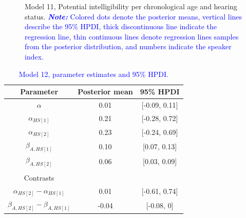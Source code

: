 \documentclass[
  authoryear,
  preprint,
  1p]{elsarticle}
\begin{document}
\label{cell-fig-rq3-intelligibility-model11}
\begin{figure}[H]


\caption{\label{fig-rq3-intelligibility-model11}Model 11, Potential
intelligibility per chronological age and hearing status.
\textcolor{blue}{\textbf{\emph{Note:}} Colored dots denote the posterior means, vertical
lines describe the 95\% HPDI, thick discontinuous line indicate the
regression line, thin continuous lines denote regression lines samples
from the posterior distribution, and numbers indicate the speaker
index.}}

\end{figure}%

\begin{longtable}[]{@{}ccc@{}}

\caption{\label{tbl-parameter-model12}\textcolor{blue}{Model 12, parameter estimates and
95\% HPDI.}}

\tabularnewline

\toprule\noalign{}
Parameter & Posterior mean & 95\% HPDI \\
\midrule\noalign{}
\endhead
\bottomrule\noalign{}
\endlastfoot
\(\alpha\) & 0.01 & {[}-0.09, 0.11{]} \\
\(\alpha_{HS[1]}\) & 0.21 & {[}-0.28, 0.72{]} \\
\(\alpha_{HS[2]}\) & 0.23 & {[}-0.24, 0.69{]} \\
\(\beta_{A,HS[1]}\) & 0.10 & {[}0.07, 0.13{]} \\
\(\beta_{A,HS[2]}\) & 0.06 & {[}0.03, 0.09{]} \\
& & \\
Contrasts & & \\
\(\alpha_{HS[2]} - \alpha_{HS[1]}\) & 0.01 & {[}-0.61, 0.74{]} \\
\(\beta_{A,HS[2]} - \beta_{A,HS[1]}\) & -0.04 & {[}-0.08, 0{]} \\

\end{longtable}
\end{document}
